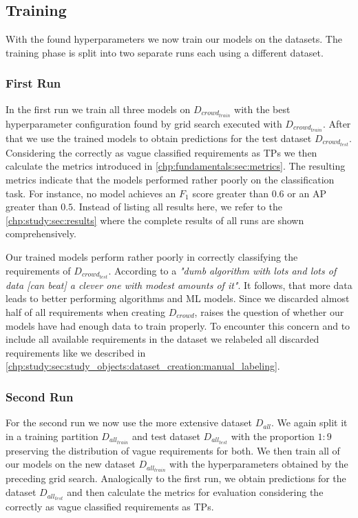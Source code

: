 \subsection{Training}
\label{chp:study:sec:execution:subsec:training}
With the found hyperparameters we now train our models on the datasets.
The training phase is split into two separate runs each using a different dataset.

\subsubsection{First Run}
\label{chp:study:sec:execution:subsec:training:first_run}
In the first run we train all three models on $D_{crowd_{train}}$ with the best hyperparameter configuration found by grid search executed with $D_{crowd_{train}}$.
After that we use the trained models to obtain predictions for the test dataset $D_{crowd_{test}}$.
Considering the correctly as vague classified requirements as \acp{TP} we then calculate the metrics introduced in \cref{chp:fundamentals:sec:metrics}.
The resulting metrics indicate that the models performed rather poorly on the classification task.
For instance, no model achieves an $F_1$ score greater than $0.6$ or an \ac{AP} greater than $0.5$.
Instead of listing all results here, we refer to the \cref{chp:study:sec:results} where the complete results of all runs are shown comprehensively.

Our trained models perform rather poorly in correctly classifying the requirements of $D_{crowd_{test}}$.
According to \textcite{Domingos:2012} a \textit{"dumb algorithm with lots and lots of data [can beat] a clever one with modest amounts of it"}.
It follows, that more data leads to better performing algorithms and \ac{ML} models.
Since we discarded almost half of all requirements when creating $D_{crowd}$, raises the question of whether our models have had enough data to train properly.
To encounter this concern and to include all available requirements in the dataset we relabeled all discarded requirements like we described in \cref{chp:study:sec:study_objects:dataset_creation:manual_labeling}.

\subsubsection{Second Run}
\label{chp:study:sec:execution:subsec:training:second_run}

For the second run we now use the more extensive dataset $D_{all}$.
We again split it in a training partition $D_{all_{train}}$ and test dataset $D_{all_{test}}$ with the proportion $1\mathrm{:}9$ preserving the distribution of vague requirements for both.
We then train all of our models on the new dataset $D_{all_{train}}$ with the hyperparameters obtained by the preceding grid search.
Analogically to the first run, we obtain predictions for the dataset $D_{all_{test}}$ and then calculate the metrics for evaluation considering the correctly as vague classified requirements as \acp{TP}.
